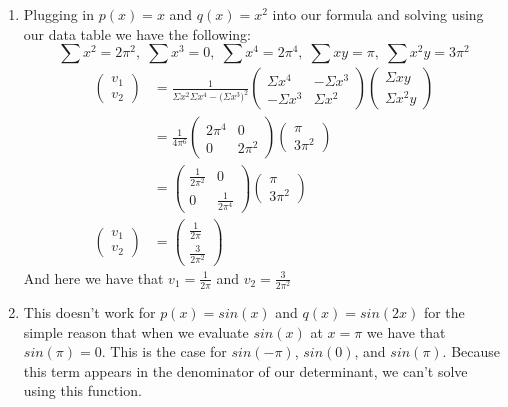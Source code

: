\documentclass[11pt,a4paper]{article}
\begin{document}
\begin{itemize}
\begin{enumerate} [label={\alph*)}]
						\item Plugging in $p(x) = x$ and $q(x)=x^2$ into our formula and solving using our data table we have the following:
						$$\displaystyle \sum x^2 = 2\pi^2, \; \displaystyle \sum x^3 = 0, \; \displaystyle \sum x^4 = 2\pi^4, \; \displaystyle \sum xy = \pi, \; \displaystyle \sum x^2y = 3\pi^2$$
						\begin{align*}
						\begin{pmatrix} v_1 \\ v_2 \end{pmatrix} &= \frac{1}{\Sigma x^2\Sigma x^4 - \big(\Sigma x^3 \big)^2}\begin{pmatrix} 
						\Sigma x^4 & -\Sigma x^3 \\
						-\Sigma x^3 & \Sigma x^2
						\end{pmatrix}\begin{pmatrix}
						\Sigma xy \\
						\Sigma x^2y
						\end{pmatrix}
						 \\
						&= \frac{1}{4\pi^6}\begin{pmatrix} 
						2\pi^4 & 0 \\
						0 & 2\pi^2
						\end{pmatrix}\begin{pmatrix}
						\pi \\
						 3\pi^2
						\end{pmatrix} \\
						&= \begin{pmatrix} 
						\frac{1}{2\pi^2} & 0 \\
						0 & \frac{1}{2\pi^4}
						\end{pmatrix}\begin{pmatrix}
						\pi \\
						 3\pi^2
						\end{pmatrix} \\
						\begin{pmatrix} v_1 \\ v_2 \end{pmatrix} &= \begin{pmatrix} \frac{1}{2\pi} \\ \frac{3}{2\pi^2} \end{pmatrix} 
						\end{align*}
						And here we have that $v_1 = \frac{1}{2\pi}$ and $v_2 = \frac{3}{2\pi^2}$
						
						\item This doesn't work for $p(x) = sin(x)$ and $q(x) = sin(2x)$ for the simple reason that when we evaluate $sin(x)$ at $x=\pi$ we have that $sin(\pi)=0$. This is the case for $sin(-\pi)$, $sin(0)$, and $sin(\pi)$. Because this term appears in the denominator of our determinant, we can't solve using this function.
						

\end{enumerate}
\end{itemize}
\end{document}
